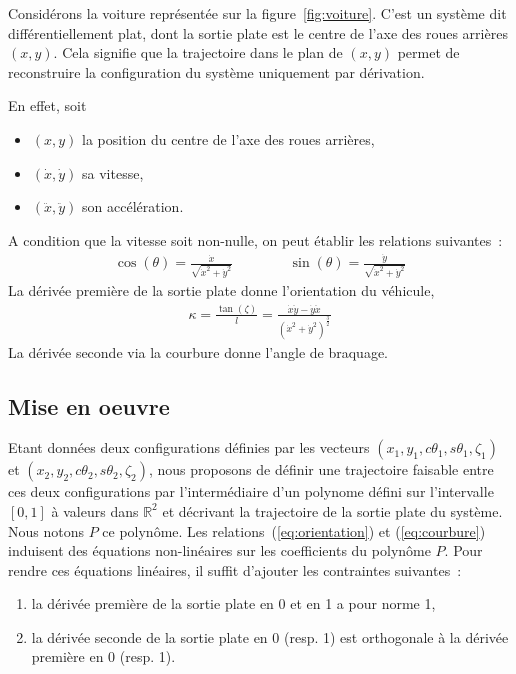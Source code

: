 \documentclass {article}
\newcommand\dx{\dot{x}}
\newcommand\dy{\dot{y}}
\newcommand\ddx{\ddot{x}}
\newcommand\ddy{\ddot{y}}
\def\real{{\mathbb R}}
\begin{document}
Considérons la voiture représentée sur la figure~\ref{fig:voiture}. C'est un système dit différentiellement plat, dont la sortie plate est le centre de l'axe des roues arrières $(x,y)$. Cela signifie que la trajectoire dans le plan de $(x,y)$ permet de reconstruire la configuration du système uniquement par dérivation.

En effet, soit
\begin {itemize}
  \item $(x,y)$ la position du centre de l'axe des roues arrières,
  \item $(\dx, \dy)$ sa vitesse,
  \item $(\ddx, \ddy)$ son accélération.
\end {itemize}
A condition que la vitesse soit non-nulle, on peut établir les relations suivantes~:
\begin {align}\label{eq:orientation}
  \cos(\theta) = \frac{\dx}{\sqrt{\dx^2+\dy^2}} & \hspace {1cm} & \sin(\theta) = \frac{\dy}{\sqrt{\dx^2+\dy^2}}
\end {align}
La dérivée première de la sortie plate donne l'orientation du véhicule,
\begin{align}\label{eq:courbure}
  \kappa = \frac{\tan (\zeta)}{l} = \frac{\dx\ddy - \dy\ddx}{(\dx^2+\dy^2)^{\frac{3}{2}}}
\end{align}
La dérivée seconde via la courbure donne l'angle de braquage.

\subsection* {Mise en oeuvre}

Etant données deux configurations définies par les vecteurs $(x_1,y_1,c\theta_1,s\theta_1,\zeta_1)$ et $(x_2,y_2,c\theta_2,s\theta_2,\zeta_2)$, nous proposons de définir une trajectoire faisable entre ces deux configurations par l'intermédiaire d'un polynome défini sur l'intervalle $[0,1]$ à valeurs dans $\real^2$ et décrivant la trajectoire de la sortie plate du système. Nous notons $P$ ce polyn\^ome. Les relations~(\ref{eq:orientation}) et (\ref{eq:courbure}) induisent des équations non-linéaires sur les coefficients du polyn\^ome $P$. Pour rendre ces équations linéaires, il suffit d'ajouter les contraintes suivantes~:
\begin{enumerate}
\item la dérivée première de la sortie plate en 0 et en 1 a pour norme 1,
\item la dérivée seconde de la sortie plate en 0 (resp. 1) est orthogonale à la dérivée première en 0 (resp. 1).
\end{enumerate}
\end{document}
